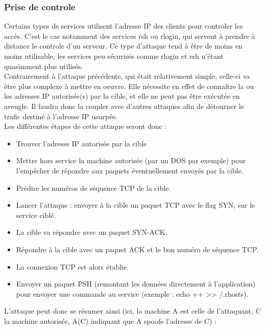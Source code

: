 \subsubsection{Prise de controle}\label{vulnerabilites:reseau:spoofing:ip:control}

Certains types de services utilisent l'adresse IP des clients pour controler les accès. C'est le cas notamment des services rsh ou rlogin, qui servent à prendre à distance le controle d'un serveur. Ce type d'attaque tend à être de moins en moins utilisable, les services peu sécurisés comme rlogin et rsh n'étant quasimment plus utilisés.
\\

Contrairement à l'attaque précédente, qui était relativement simple, celle-ci va être plus complexe à mettre en oeuvre. Elle nécessite en effet de connaître la ou les adresses IP autorisée(s) par la cible, et elle ne peut pas être exécutée en aveugle. Il faudra donc la coupler avec d'autres attaques afin de détourner le trafic destiné à l'adresse IP usurpée.
\\

Les différentes étapes de cette attaque seront donc :

\begin{itemize}
\item Trouver l'adresse IP autorisée par la cible
\item Mettre hors service la machine autorisée (par un DOS par exemple) pour l'empêcher de répondre aux paquets éventuellement envoyés par la cible.
\item Prédire les numéros de séquence TCP de la cible.
\item Lancer l'attaque : envoyer à la cible un paquet TCP avec le flag SYN, sur le service ciblé.
\item La cible va répondre avec un paquet SYN-ACK.
\item Répondre à la cible avec un paquet ACK et le bon numéro de séquence TCP.
\item La connexion TCP est alors établie.
\item Envoyer un paquet PSH (remontant les données directement à l'application) pour envoyer une commande au service (exemple : echo ++ >> /.rhosts).
\end{itemize}
\begin{tabbing}
\end{tabbing}

L'attaque peut donc se résumer ainsi (ici, la machine A est celle de l'attaquant, C la machine autorisée, A(C) indiquant que A spoofe l'adresse de C) :

